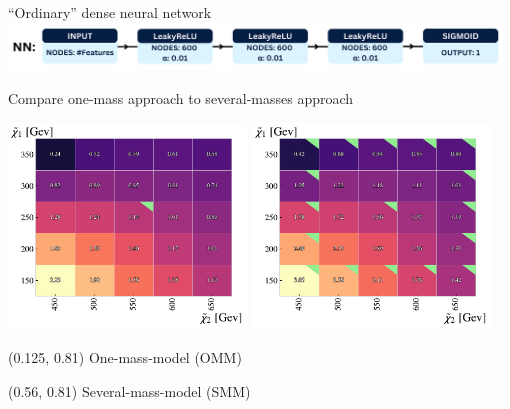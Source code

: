\documentclass[UKenglish]{beamer}
\begin{document}
\begin{frame}{``Ordinary'' dense neural network}
    \vfill
    \centering
    \includegraphics[width = 0.98\textwidth]{figures/NN.png}
\end{frame}
\begin{frame}{Compare one-mass approach to several-masses approach}
    \vfill
    \begin{center}
        \includegraphics[width = 0.475\textwidth]{figures/grids/NN_OneMass_InterpolationGridSig.pdf}
        \includegraphics[width = 0.475\textwidth]{figures/grids/NN_InterpolationGridSig.pdf}
    \end{center}
    \begin{textblock}{0.8}(0.125, 0.81)
        One-mass-model (OMM)
    \end{textblock}
    \begin{textblock}{0.8}(0.56, 0.81)
        Several-mass-model (SMM)
    \end{textblock}
\end{frame}
\end{document}
